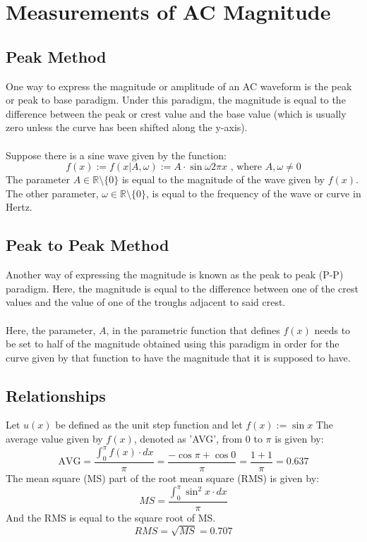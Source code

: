 \documentclass{article}
\begin{document}
	\section[Amplitude]{Measurements of AC Magnitude}
	\subsection[Peak]{Peak Method}
	One way to express the magnitude or amplitude of an AC waveform is the peak 
	or peak to base paradigm.  Under this paradigm, the magnitude is equal to 
	the difference between the peak or crest value and the base value (which is 
	usually zero unless 
	the curve has been shifted along the y-axis). \\ \\
	Suppose there is a sine wave given by the function:
	$$ f(x):=f(x\vert A, \omega):=A\cdot \sin \omega 2\pi x\text{ , where }A, 
	\omega \ne 0$$
	The parameter $A \in \mathbb{R}\setminus\{0\}$ is equal to the magnitude of 
	the wave given by $f(x)$.  The other parameter, $\omega \in 
	\mathbb{R}\setminus \{0\}$, is equal to the frequency of the wave or curve 
	in Hertz.
	\subsection[PeakToPeak]{Peak to Peak Method}
	Another way of expressing the magnitude is known as the peak to peak (P-P) 
	paradigm.  Here, the magnitude is equal to the difference between one of 
	the crest values and the value of one of the troughs adjacent to said 
	crest. \\ \\
	Here, the parameter, $A$, in the parametric function that defines $f(x)$ 
	needs to be set to half of the magnitude obtained using this paradigm in 
	order for the curve given by that function to have the magnitude that it is 
	supposed to have.
	\subsection[Relationships]{Relationships}
	Let $u(x)$ be defined as the unit step function and let $f(x):=\sin x$
	The average value given by $f(x)$, denoted as 'AVG', from $0$ to $\pi$ is 
	given by:
	$$\text{AVG} = \frac{\int_{0}^{\pi}f(x)\cdot dx}{\pi} = \frac{-\cos \pi + 
	\cos 0}{\pi} = \frac{1 + 1}{\pi} = 0.637 $$
	The mean square (MS) part of the root mean square (RMS) is given by:
	$$ MS = \frac{\int_{0}^{\pi}\sin^2x\cdot dx}{\pi}$$
	And the RMS is equal to the square root of MS.
	$$ RMS = \sqrt{MS} = 0.707$$
\end{document}

